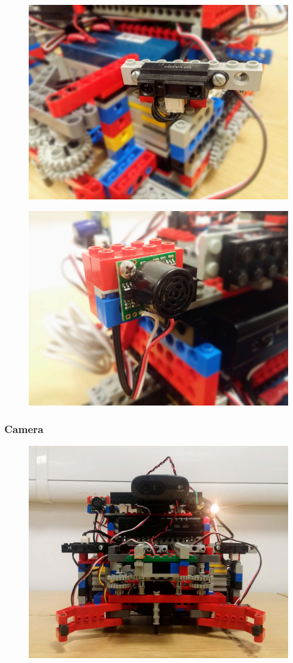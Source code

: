 \begin{figure}[ht]
    \centering
    \includegraphics[width=0.7\linewidth]{res/robot-pics/ir-sensor-placement.jpg}
    \caption{}
    \label{fig:}
\end{figure}

\begin{figure}[ht]
    \centering
    \includegraphics[width=0.7\linewidth]{res/robot-pics/sonar-placement.jpg}
    \caption{}
    \label{fig:}
\end{figure}

\subsubsection{Camera}

\begin{figure}[ht]
    \centering
    \includegraphics[width=0.7\linewidth]{res/robot-pics/view-front.jpg}
    \caption{}
    \label{fig:}
\end{figure}

